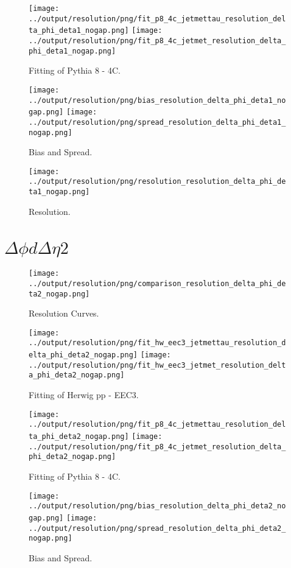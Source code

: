 \documentclass[11pt]{book}
\begin{document}
\begin{figure}[ht]
\centering
\texttt{[image: ../output/resolution/png/fit\_p8\_4c\_jetmettau\_resolution\_delta\_phi\_deta1\_nogap.png]}
\texttt{[image: ../output/resolution/png/fit\_p8\_4c\_jetmet\_resolution\_delta\_phi\_deta1\_nogap.png]}
\caption{Fitting of Pythia 8 - 4C.}
\end{figure}

\begin{figure}[ht]
\centering
\texttt{[image: ../output/resolution/png/bias\_resolution\_delta\_phi\_deta1\_nogap.png]}
\texttt{[image: ../output/resolution/png/spread\_resolution\_delta\_phi\_deta1\_nogap.png]}
\caption{Bias and Spread.}
\end{figure}


\begin{figure}[ht]
\centering
\texttt{[image: ../output/resolution/png/resolution\_resolution\_delta\_phi\_deta1\_nogap.png]}
\caption{Resolution.}
\end{figure}
\clearpage

\section{$\Delta\phi d\Delta\eta 2$}

\begin{figure}[ht]
\centering
\texttt{[image: ../output/resolution/png/comparison\_resolution\_delta\_phi\_deta2\_nogap.png]}
\caption{Resolution Curves.}
\end{figure}


\begin{figure}[ht]
\centering
\texttt{[image: ../output/resolution/png/fit\_hw\_eec3\_jetmettau\_resolution\_delta\_phi\_deta2\_nogap.png]}
\texttt{[image: ../output/resolution/png/fit\_hw\_eec3\_jetmet\_resolution\_delta\_phi\_deta2\_nogap.png]}
\caption{Fitting of Herwig pp - EEC3.}
\end{figure}

\begin{figure}[ht]
\centering
\texttt{[image: ../output/resolution/png/fit\_p8\_4c\_jetmettau\_resolution\_delta\_phi\_deta2\_nogap.png]}
\texttt{[image: ../output/resolution/png/fit\_p8\_4c\_jetmet\_resolution\_delta\_phi\_deta2\_nogap.png]}
\caption{Fitting of Pythia 8 - 4C.}
\end{figure}

\begin{figure}[ht]
\centering
\texttt{[image: ../output/resolution/png/bias\_resolution\_delta\_phi\_deta2\_nogap.png]}
\texttt{[image: ../output/resolution/png/spread\_resolution\_delta\_phi\_deta2\_nogap.png]}
\caption{Bias and Spread.}
\end{figure}
\end{document}
